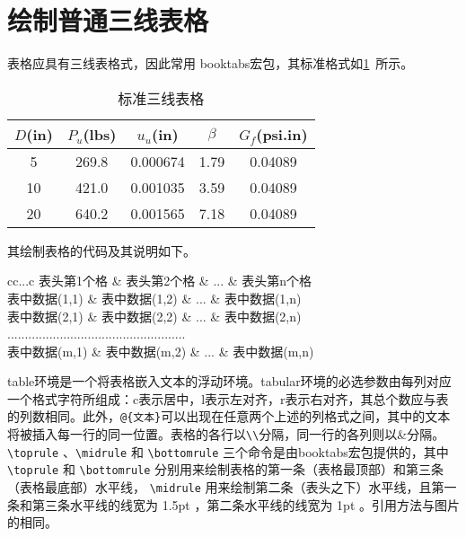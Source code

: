 \section{绘制普通三线表格}

表格应具有三线表格式，因此常用 booktabs宏包，其标准格式如\cref{tab:001}~所示。

\begin{table}[H]
    \caption{标准三线表格}\label{tab:001} \centering
    \vspace{-6pt}
    \begin{tabular}{ccccc}
        \toprule[1.5pt]
        $D$(in) & $P_u$(lbs) & $u_u$(in) & $\beta$ & $G_f$(psi.in)\\
        \midrule[1pt]
        5 & 269.8 & 0.000674 & 1.79 & 0.04089\\
        10 & 421.0 & 0.001035 & 3.59 & 0.04089\\
        20 & 640.2 & 0.001565 & 7.18 & 0.04089\\
        \bottomrule[1.5pt]
    \end{tabular}
\end{table}

其绘制表格的代码及其说明如下。
\begin{tcode}
    \begin{table}[!htbp]
        \caption[标签名]{中文标题}
        \begin{tabular}{cc...c}
            \toprule[1.5pt]
            表头第1个格   & 表头第2个格   & ... & 表头第n个格  \\
            \midrule[1pt]
            表中数据(1,1) & 表中数据(1,2) & ... & 表中数据(1,n)\\
            表中数据(2,1) & 表中数据(2,2) & ... & 表中数据(2,n)\\
            ...................................................\\
            表中数据(m,1) & 表中数据(m,2) & ... & 表中数据(m,n)\\
            \bottomrule[1.5pt]
        \end{tabular}
    \end{table}
\end{tcode}

\bigskip

table环境是一个将表格嵌入文本的浮动环境。tabular环境的必选参数由每列对应一个格式字符所组成：c表示居中，l表示左对齐，r表示右对齐，其总个数应与表的列数相同。此外，\verb|@{文本}|可以出现在任意两个上述的列格式之间，其中的文本将被插入每一行的同一位置。表格的各行以\verb|\\|分隔，同一行的各列则以\&分隔。 \verb|\toprule| 、\verb|\midrule| 和 \verb|\bottomrule| 三个命令是由booktabs宏包提供的，其中 \verb|\toprule| 和 \verb|\bottomrule| 分别用来绘制表格的第一条（表格最顶部）和第三条（表格最底部）水平线， \verb|\midrule| 用来绘制第二条（表头之下）水平线，且第一条和第三条水平线的线宽为 1.5pt ，第二条水平线的线宽为 1pt 。引用方法与图片的相同。

